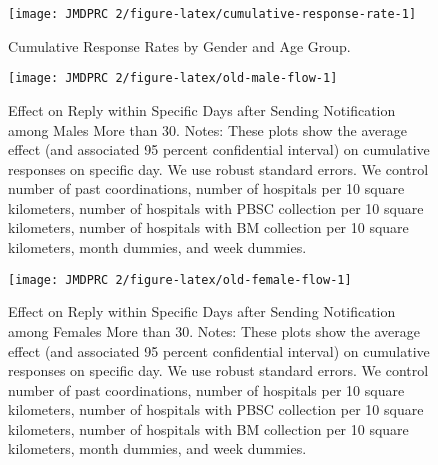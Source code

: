 \documentclass[12pt, a4paper]{article}
\begin{document}
\begin{figure}[t]
\texttt{[image: JMDPRC~2/figure-latex/cumulative-response-rate-1]} \caption{Cumulative Response Rates by Gender and Age Group.}\label{fig:cumulative-response-rate}
\end{figure}

\begin{figure}[t]
\texttt{[image: JMDPRC~2/figure-latex/old-male-flow-1]} \caption{Effect on Reply within Specific Days after Sending Notification among Males More than 30. Notes: These plots show the average effect (and associated 95 percent confidential interval) on cumulative responses on specific day. We use robust standard errors. We control number of past coordinations, number of hospitals per 10 square kilometers, number of hospitals with PBSC collection per 10 square kilometers, number of hospitals with BM collection per 10 square kilometers, month dummies, and week dummies.}\label{fig:old-male-flow}
\end{figure}

\begin{figure}[t]
\texttt{[image: JMDPRC~2/figure-latex/old-female-flow-1]} \caption{Effect on Reply within Specific Days after Sending Notification among Females More than 30. Notes: These plots show the average effect (and associated 95 percent confidential interval) on cumulative responses on specific day. We use robust standard errors. We control number of past coordinations, number of hospitals per 10 square kilometers, number of hospitals with PBSC collection per 10 square kilometers, number of hospitals with BM collection per 10 square kilometers, month dummies, and week dummies.}\label{fig:old-female-flow}
\end{figure}
\end{document}
